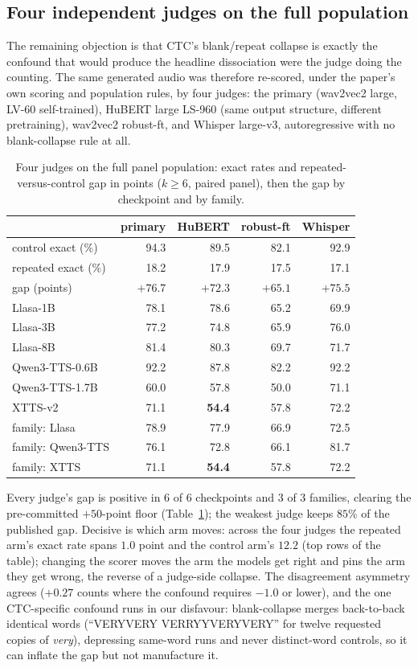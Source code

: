 \subsection{Four independent judges on the full population}\label{sec:judgefloor}
The remaining objection is that CTC's blank/repeat collapse is exactly the confound that would produce the headline
dissociation were the judge doing the counting. The same generated audio was therefore re-scored, under the paper's
own scoring and population rules, by four judges: the primary (wav2vec2 large, LV-60 self-trained), HuBERT large
LS-960 (same output structure, different pretraining), wav2vec2 robust-ft, and Whisper large-v3, autoregressive with
no blank-collapse rule at all.
\begin{table}[htbp]
\centering
\caption{Four judges on the full panel population: exact rates and repeated-versus-control gap in points
($k\ge6$, paired panel), then the gap by checkpoint and by family.}
\label{tab:fourjudges}
\small
\begin{tabular}{lrrrr}
\toprule
 & primary & HuBERT & robust-ft & Whisper \\
\midrule
control exact (\%) & 94.3 & 89.5 & 82.1 & 92.9 \\
repeated exact (\%) & 18.2 & 17.9 & 17.5 & 17.1 \\
gap (points) & $+76.7$ & $+72.3$ & $+65.1$ & $+75.5$ \\
\midrule
Llasa-1B & 78.1 & 78.6 & 65.2 & 69.9 \\
Llasa-3B & 77.2 & 74.8 & 65.9 & 76.0 \\
Llasa-8B & 81.4 & 80.3 & 69.7 & 71.7 \\
Qwen3-TTS-0.6B & 92.2 & 87.8 & 82.2 & 92.2 \\
Qwen3-TTS-1.7B & 60.0 & 57.8 & 50.0 & 71.1 \\
XTTS-v2 & 71.1 & \textbf{54.4} & 57.8 & 72.2 \\
\midrule
family: Llasa & 78.9 & 77.9 & 66.9 & 72.5 \\
family: Qwen3-TTS & 76.1 & 72.8 & 66.1 & 81.7 \\
family: XTTS & 71.1 & \textbf{54.4} & 57.8 & 72.2 \\
\bottomrule
\end{tabular}
\end{table}

\noindent Every judge's gap is positive in $6$ of $6$ checkpoints and $3$ of $3$
families, clearing the pre-committed $+50$-point floor
(Table~\ref{tab:fourjudges}); the weakest judge keeps $85\%$ of the
published gap. Decisive is which arm moves: across the four judges the
repeated arm's exact rate spans $1.0$ point and the control arm's $12.2$
(top rows of the table); changing the scorer moves the arm the models get
right and pins the arm they get wrong, the reverse of a judge-side
collapse. The disagreement asymmetry agrees ($+0.27$ counts where the
confound requires $-1.0$ or lower), and the one CTC-specific confound runs
in our disfavour: blank-collapse merges back-to-back identical words
(``VERYVERY VERRYYVERYVERY'' for twelve requested copies of \emph{very}),
depressing same-word runs and never distinct-word controls, so it can
inflate the gap but not manufacture it.

